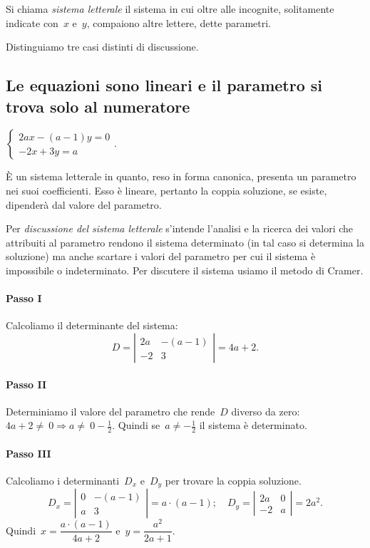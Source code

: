  \begin{definizione}
 Si chiama \emph{sistema letterale} il sistema in cui
oltre alle incognite, solitamente indicate con~$x$ e~$y$, compaiono altre
lettere, dette parametri.
 \end{definizione}

Distinguiamo tre casi distinti di discussione.

\subsection*{Le equazioni sono lineari e il parametro si trova solo al numeratore}

\begin{exrig}\vspace{1.10ex}
 \begin{esempio}
 $\left\{\begin{array}{l}{2ax-(a-1)y=0}\\{-2x+3y=a}\end{array}\right..$


È un sistema letterale in quanto, reso in forma
canonica, presenta un parametro nei suoi coefficienti. Esso è
lineare, pertanto la coppia soluzione, se esiste, dipenderà dal
valore del parametro.

Per \emph{discussione del sistema letterale} s'intende
l'analisi e la ricerca dei valori che attribuiti al
parametro rendono il sistema determinato (in tal caso si determina la
soluzione) ma anche scartare i valori del parametro per cui il sistema
è impossibile o indeterminato.
Per discutere il sistema usiamo il metodo di Cramer.

\paragraph{Passo I} Calcoliamo il determinante del sistema:
\[D=\left|\begin{array}{cc}{2a}&{-(a-1)}\\{-2}&{3}\end{array}\right|=4a+2.\]

\paragraph{Passo II} Determiniamo il valore del parametro che
rende~$D$ diverso da zero:~$4a+2\neq~0\Rightarrow a\neq~0-\frac{1}{2}$. Quindi se~$a\neq -{\frac{1}{2}}$ il sistema è
determinato.

\paragraph{Passo III} Calcoliamo i determinanti~$D_{x}$
e~$D_{y}$ per trovare la coppia soluzione.
\[D_{x}=\left|\begin{array}{cc}{0}&{-(a-1)}\\{a}&{3}\end{array}\right|=a\cdot (a-1);\quad
D_{y}=\left|\begin{array}{cc}{2a}&{0}\\{-2}&{a}\end{array}\right|=2a^{2}.\]
Quindi~$x=\dfrac{a\cdot (a-1)}{4a+2}$ e~$y=\dfrac{a^{2}}{2a+1}$.


\end{esempio}
\end{exrig}
